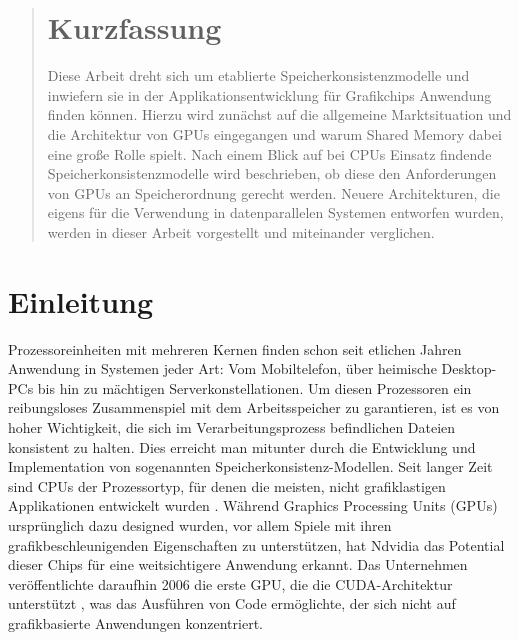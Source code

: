 \documentclass[final,bibliography=totocnumbered]{include/sikseminar}
\begin{document}
\makeTitle

\makeAuthor

\date{14.01.2019}

\subject{Safety-Critical Systems }

\maketitle


\begin{abstract}
\section*{Kurzfassung}
Diese Arbeit dreht sich um etablierte Speicherkonsistenzmodelle und inwiefern sie in der Applikationsentwicklung für Grafikchips Anwendung finden können.
Hierzu wird zunächst auf die allgemeine Marktsituation und die Architektur von GPUs eingegangen und warum Shared Memory dabei eine große Rolle spielt.
Nach einem Blick auf bei CPUs Einsatz findende Speicherkonsistenzmodelle wird beschrieben, ob diese den Anforderungen von GPUs an Speicherordnung gerecht werden.
Neuere Architekturen, die eigens für die Verwendung in datenparallelen Systemen entworfen wurden, werden in dieser Arbeit vorgestellt und miteinander verglichen.
\end{abstract}
\thispagestyle{empty}

\newpage
\tableofcontents

\newpage

\newpage
\section{Einleitung}
Prozessoreinheiten mit mehreren Kernen finden schon seit etlichen Jahren Anwendung in Systemen jeder Art: Vom Mobiltelefon, über heimische 
Desktop-PCs bis hin zu mächtigen Serverkonstellationen. Um diesen Prozessoren ein reibungsloses Zusammenspiel mit dem Arbeitsspeicher zu garantieren, ist es von hoher Wichtigkeit, die sich im Verarbeitungsprozess befindlichen Dateien konsistent zu halten. Dies erreicht man mitunter durch
die Entwicklung und Implementation von sogenannten Speicherkonsistenz-Modellen. 
Seit langer Zeit sind CPUs der Prozessortyp, für denen die meisten, nicht grafiklastigen Applikationen entwickelt wurden \cite{syncornot}. Während Graphics Processing Units (GPUs) ursprünglich dazu designed wurden, vor allem Spiele mit ihren grafikbeschleunigenden Eigenschaften zu unterstützen,
hat Ndvidia das Potential  dieser Chips für eine weitsichtigere Anwendung erkannt. Das Unternehmen veröffentlichte daraufhin 2006 die erste GPU, die die CUDA-Architektur unterstützt \cite{cudabe}, 
was das Ausführen von Code ermöglichte, der sich nicht auf grafikbasierte Anwendungen konzentriert.
\end{document}
